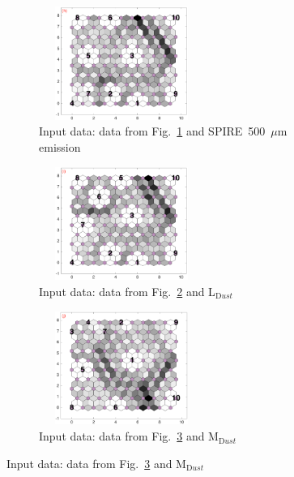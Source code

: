 \begin{figure}
\begin{subfigure}[b]{0.25\textwidth}
        \label{fig: col3and17_dist}
    \end{subfigure}
        \hfill
    \begin{subfigure}[b]{0.25\textwidth}
        \centering
        \includegraphics[width=54mm, height=37mm]{../../images0.01/M31/2D/diff_dimension/combine_2D_data_between_cols3and18.png}
        \caption{Input data: data from Fig.~\ref{fig: col3and17_dist} and SPIRE~500~$\mu$m emission }
        \label{fig: col3and18_dist}
    \end{subfigure}
        \hfill
    \begin{subfigure}[b]{0.25\textwidth}
        \centering
        \includegraphics[width=54mm, height=37mm]{../../images0.01/M31/2D/diff_dimension/combine_2D_data_between_cols3and19.png}
         \caption{Input data: data from Fig.~\ref{fig: col3and18_dist} and L$_{{\mathrm Dust}}$}
        \label{fig: col3and19_dist}
    \end{subfigure}
        \hfill
    \begin{subfigure}[b]{0.25\textwidth}
        \centering
        \includegraphics[width=54mm, height=37mm]{../../images0.01/M31/2D/diff_dimension/combine_2D_data_between_cols3and20.png}
          \caption{Input data: data from Fig.~\ref{fig: col3and19_dist} and M$_{{\mathrm Dust}}$}
        \label{fig: col3and20_dist}
    \end{subfigure}        \hfill

\end{figure}

